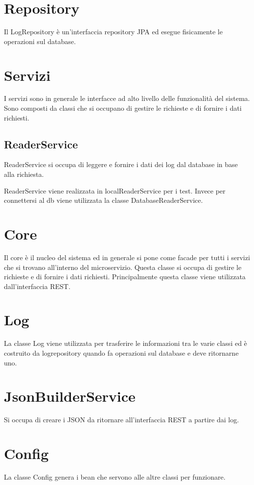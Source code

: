 \section{Repository}
Il LogRepository è un'interfaccia repository JPA ed esegue fisicamente le operazioni sul database.

\section{Servizi}

I servizi sono in generale le interfacce ad alto livello delle funzionalità del sistema. Sono composti da classi che si occupano di gestire le richieste e di fornire i dati richiesti.

\subsection{ReaderService}
ReaderService si occupa di leggere e fornire i dati dei log dal database in base alla richiesta.

ReaderService viene realizzata in localReaderService per i test. Invece per connettersi al db viene utilizzata la classe DatabaseReaderService.

\section{Core}
Il core è il nucleo del sistema ed in generale si pone come facade per tutti i servizi che si trovano all'interno del microservizio. Questa classe si occupa di gestire le richieste e di fornire i dati richiesti.
Principalmente questa classe viene utilizzata dall'interfaccia REST.

\section{Log}
La classe Log viene utilizzata per trasferire le informazioni tra le varie classi ed è costruito da logrepository quando fa operazioni sul database e deve ritornarne uno.

\section{JsonBuilderService}
Si occupa di creare i JSON da ritornare all'interfaccia REST a partire dai log.

\section{ Config}
La classe Config genera i bean che servono alle altre classi per funzionare.



